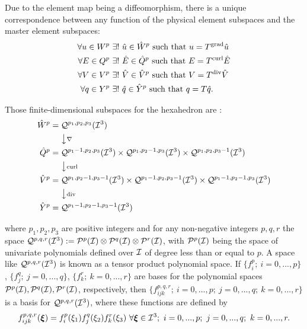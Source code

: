 Due to the element map being a diffeomorphism, there is a unique correspondence between any function of the physical element subspaces and the master element subspaces:
% 
\begin{align}
    \forall u\in W^p\ &\exists !\ \hat{u}\in\hat{W}^p\text{ such that }u=T^{\operatorname{grad}}\hat{u}\\
    \forall E\in Q^p\ &\exists !\ \hat{E}\in\hat{Q}^p\text{ such that }E=T^{\operatorname{curl}}\hat{E}\\
    \forall V\in V^p\ &\exists !\ \hat{V}\in\hat{V}^p\text{ such that }V=T^{\operatorname{div}}\hat{V}\\
    \forall q\in Y^p\ &\exists !\ \hat{q}\in\hat{Y}^p\text{ such that }q=T\hat{q}.
\end{align}

Those finite-dimensional subspaces for the hexahedron are \cite{hpbook2,Nedelec80}:
% 
\begin{align*}
    \hat{W}^p&=\mathcal{Q}^{p_1,p_2,p_3}(\mathcal{I}^3)\\
    \ &\ \ \ \ \big\downarrow  \scriptstyle{\nabla}\\
    \hat{Q}^p&=\mathcal{Q}^{p_1-1,p_2,p_3}(\mathcal{I}^3)\times\mathcal{Q}^{p_1,p_2-1,p_3}(\mathcal{I}^3)\times\mathcal{Q}^{p_1,p_2,p_3-1}(\mathcal{I}^3)\\
    \ &\ \ \ \ \big\downarrow  \scriptstyle{\operatorname{curl}}\\
    \hat{V}^p&=\mathcal{Q}^{p_1,p_2-1,p_3-1}(\mathcal{I}^3)\times\mathcal{Q}^{p_1-1,p_2,p_3-1}(\mathcal{I}^3)\times\mathcal{Q}^{p_1-1,p_2-1,p_3}(\mathcal{I}^3)\\
    \ &\ \ \ \ \big\downarrow  \scriptstyle{\operatorname{div}}\\
    \hat{Y}^p&=\mathcal{Q}^{p_1-1,p_2-1,p_3-1}(\mathcal{I}^3)
\end{align*}

\noindent where $p_1,p_2,p_3$ are positive integers and for any non-negative integers $p,q,r$ the space $\mathcal{Q}^{p,q,r}(\mathcal{I}^3):=\mathcal{P}^p(\mathcal{I})\otimes\mathcal{P}^q(\mathcal{I})\otimes\mathcal{P}^r(\mathcal{I})$, with $\mathcal{P}^p(\mathcal{I})$ being the space of univariate polynomials defined over $\mathcal{I}$ of degree less than or equal to $p$. A space like $\mathcal{Q}^{p,q,r}(\mathcal{I}^3)$ is known as a tensor product polynomial space. 
{\color{blue}If $\{f_i^p;\ i=0,...,p\}$, $\{f_j^q;\ j=0,...,q\}$, $\{f_k^r;\ k=0,...,r\}$ are bases for the polynomial spaces $\mathcal{P}^p(\mathcal{I}),\mathcal{P}^q(\mathcal{I}),\mathcal{P}^r(\mathcal{I})$, respectively, then $\{f_{ijk}^{p,q,r};\ i=0,...,p;\ j=0,...,q;\ k=0,...,r\}$ is a basis for $\mathcal{Q}^{p,q,r}(\mathcal{I}^3)$, where these functions are defined by
\begin{equation}
    f_{ijk}^{p,q,r}(\bsxi)=f_i^p(\xi_1)f_j^q(\xi_2)f_k^r(\xi_3)\ \forall\bsxi\in\mcI^3;\ i=0,...,p;\ j=0,...,q;\ k=0,...,r.
\end{equation} }

